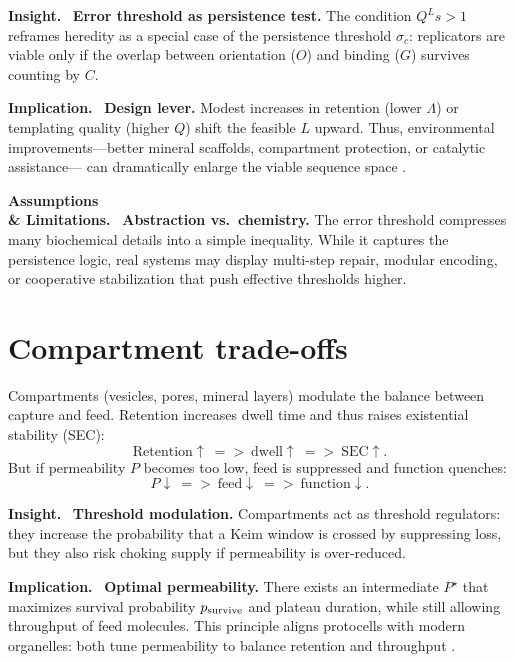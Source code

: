 \documentclass[12pt,a4paper,oneside]{scrreprt}
\def\Rightarrow{=>}%
\newenvironment{insight}{\par\vspace{0.5em}\noindent\textbf{Insight.}\ }{\par\vspace{0.5em}}
\newenvironment{implication}{\par\vspace{0.5em}\noindent\textbf{Implication.}\ }{\par\vspace{0.5em}}
\newenvironment{limitation}{\par\vspace{0.5em}\noindent\textbf{Assumptions \\ \& Limitations.}\ }{\par\vspace{0.5em}}
\begin{document}
\begin{insight}
\textbf{Error threshold as persistence test.} 
The condition $Q^L s > 1$ reframes heredity 
as a special case of the persistence threshold $\sigma_c$: 
replicators are viable only if the overlap between 
orientation ($O$) and binding ($G$) survives counting by $C$. 
\end{insight}

\begin{implication}
\textbf{Design lever.} 
Modest increases in retention (lower $\Lambda$) 
or templating quality (higher $Q$) shift the feasible $L$ upward. 
Thus, environmental improvements—better mineral scaffolds, 
compartment protection, or catalytic assistance— 
can dramatically enlarge the viable sequence space 
\citep{Eigen1971Selforganization,Nowak1992ErrorThreshold}.
\end{implication}

\begin{limitation}
\textbf{Abstraction vs.\ chemistry.} 
The error threshold compresses many biochemical details 
into a simple inequality. 
While it captures the persistence logic, 
real systems may display multi-step repair, 
modular encoding, or cooperative stabilization 
that push effective thresholds higher. 
\end{limitation}

\section{Compartment trade-offs}\label{sec:life-compartments}

Compartments (vesicles, pores, mineral layers) 
modulate the balance between capture and feed. 
Retention increases dwell time and thus raises existential stability (SEC):
\[
\text{Retention}\uparrow \ \Rightarrow\ \text{dwell}\uparrow \ \Rightarrow\ \text{SEC}\uparrow.
\]
But if permeability $P$ becomes too low, 
feed is suppressed and function quenches:
\[
P\downarrow \ \Rightarrow\ \text{feed}\downarrow \ \Rightarrow\ \text{function}\downarrow.
\]

\begin{insight}
\textbf{Threshold modulation.} 
Compartments act as threshold regulators: 
they increase the probability that a Keim window is crossed 
by suppressing loss, but they also risk choking supply 
if permeability is over-reduced.
\end{insight}

\begin{implication}
\textbf{Optimal permeability.} 
There exists an intermediate $P^\star$ that maximizes survival 
probability $p_{\rm survive}$ and plateau duration, 
while still allowing throughput of feed molecules. 
This principle aligns protocells with modern organelles: 
both tune permeability to balance retention and throughput 
\citep{Szostak2001Protocells,Chen2006ProtocellPermeability}.
\end{implication}
\end{document}
